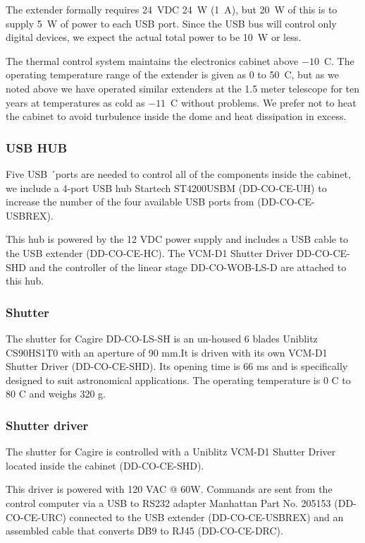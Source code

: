 \documentclass{article}
\begin{document}
The extender formally requires 24~VDC 24~W (1~A), but 20~W of this is to supply 5~W of power to each USB port. Since the USB bus will control only digital devices, we expect the actual total power to be 10~W or less.

The thermal control system maintains the electronics cabinet above $-10$~C. The operating temperature range of the extender is given as 0 to 50~C, but as we noted above we have operated similar extenders at the 1.5 meter telescope for ten years at temperatures as cold as $-11$~C without problems. We prefer not to heat the cabinet to avoid turbulence inside the dome and heat dissipation in excess.

\subsubsection{USB HUB}
Five USB ´ports are needed to control all of the components inside the cabinet, we include a 4-port USB hub Startech ST4200USBM (DD-CO-CE-UH) to increase the number of the four available USB ports from (DD-CO-CE-USBREX). 

This hub is powered by the 12 VDC power supply and includes a USB cable to the USB extender (DD-CO-CE-HC). The VCM-D1 Shutter Driver DD-CO-CE-SHD and the controller of the linear stage DD-CO-WOB-LS-D are attached to this hub.

\subsubsection{Shutter}
The shutter for Cagire DD-CO-LS-SH is an  un-housed 6 blades Uniblitz CS90HS1T0 with an aperture of 90 mm.It is driven with its own VCM-D1 Shutter Driver (DD-CO-CE-SHD). Its opening time is 66 ms and is specifically designed to suit astronomical applications. The operating temperature is 0 C to 80 C and weighs 320 g.

\subsubsection{Shutter driver}
The shutter for Cagire is controlled with a Uniblitz VCM-D1 Shutter Driver located inside the cabinet (DD-CO-CE-SHD). 

This driver is powered with 120 VAC @ 60W. Commands are sent from the control computer via a USB to RS232 adapter Manhattan Part No. 205153 (DD-CO-CE-URC) connected to the USB extender (DD-CO-CE-USBREX) and an assembled cable that converts DB9 to RJ45 (DD-CO-CE-DRC).
\end{document}

